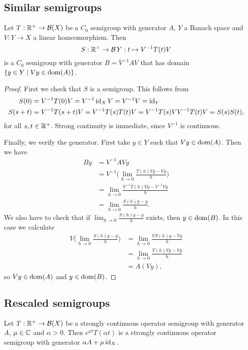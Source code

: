 \subsection{Similar semigroups}
\begin{proposition}
Let $T: \mathbb{R}^+\to \operatorname{\mathcal{B}}(X)$ be a $C_0$ semigroup with generator $A$, $Y$ a Banach space and $V: Y\to X$ a linear homeomorphism. Then
\[ S: \mathbb{R}^+ \to \operatorname{\mathcal{B}}{Y}: t\mapsto V^{-1}T(t)V \]
is a $C_0$ semigroup with generator $B = V^{-1}AV$ that has domain $\setbuilder{y\in Y}{Vy \in \dom(A)}$.
\end{proposition}
\begin{proof}
First we check that $S$ is a semigroup. This follows from
\begin{align*}
S(0) &= V^{-1}T(0)V = V^{-1}\operatorname{id}_XV = V^{-1}V = \operatorname{id}_Y \\
S(s+t) &= V^{-1}T(s+t)V = V^{-1}T(s)T(t)V = V^{-1}T(s)VV^{-1}T(t)V = S(s)S(t),
\end{align*}
for all $s,t\in \mathbb{R}^+$. Strong continuity is immediate, since $V^{-1}$ is continuous.

Finally, we verify the generator. First take $y\in Y$ such that $Vy \in \operatorname{dom}(A)$. Then we have
\begin{align*}
By &= V^{-1}AVy \\
&= V^{-1}\Big(\lim_{h\to 0}\frac{T(h)Vy - Vy}{h}\Big) \\
&= \lim_{h\to 0}\frac{V^{-1}T(h)Vy - V^{-1}Vy}{h} \\
&= \lim_{h\to 0}\frac{S(h)y - y}{h}.
\end{align*}
We also have to check that if $\lim_{h\to 0}\frac{S(h)y - y}{h}$ exists, then $y\in \operatorname{dom}(B)$. In this case we calculate
\begin{align*}
V\Big(\lim_{h\to 0}\frac{S(h)y - y}{h}\Big) &= \lim_{h\to 0}\frac{VS(h)y - Vy}{h} \\
&= \lim_{h\to 0}\frac{T(h)Vy - Vy}{h} \\
&= A(Vy),
\end{align*}
so $Vy\in \operatorname{dom}(A)$ and $y\in\operatorname{dom}(B)$.
\end{proof}

\subsection{Rescaled semigroups}
\begin{proposition}
Let $T: \mathbb{R}^+\to \operatorname{\mathcal{B}}(X)$ be a strongly continuous operator semigroup with generator $A$, $\mu\in\mathbb{C}$ and $\alpha >0$. Then $e^{\mu t}T(\alpha t)$ is a strongly continuous operator semigroup with generator $\alpha A + \mu\operatorname{id}_X$.
\end{proposition}

